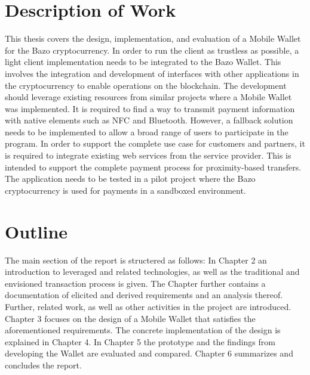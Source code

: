 \section{Description of Work}
This thesis covers the design, implementation, and evaluation of a Mobile Wallet for the Bazo cryptocurrency. In order to run the client as trustless as possible, a light client implementation needs to be integrated to the Bazo Wallet. This involves the integration and development of interfaces with other applications in the cryptocurrency to enable operations on the blockchain.
The development should leverage existing resources from similar projects where a Mobile Wallet was implemented.
It is required to find a way to transmit payment information with native elements such as NFC and Bluetooth. However, a fallback solution needs to be implemented to allow a broad range of users to participate in the program.
In order to support the complete use case for customers and partners, it is required to integrate existing web services from the service provider. This is intended to support the complete payment process for proximity-based transfers.
The application needs to be tested in a pilot project where the Bazo cryptocurrency is used for payments in a sandboxed environment.

\section{Outline}
The main section of the report is structered as follows:
In Chapter 2 an introduction to leveraged and related technologies, as well as the traditional and envisioned transaction process is given. The Chapter further contains a documentation of elicited and derived requirements and an analysis thereof. Further, related work, as well as other activities in the project are introduced. Chapter 3 focuses on the design of a Mobile Wallet that satisfies the aforementioned requirements. The concrete implementation of the design is explained in Chapter 4. In Chapter 5 the prototype and the findings from developing the Wallet are evaluated and compared.
Chapter 6 summarizes and concludes the report.